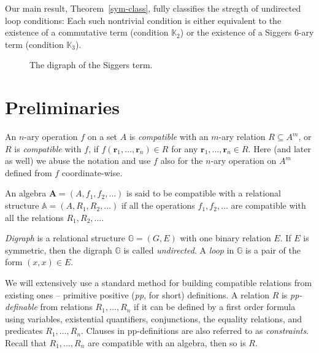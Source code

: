 \documentclass[a4paper]{article}
\def\inkpict#1#2#3{\medskip
\begin{figure}[!ht]
  \def\svgwidth{#1}
  \centering
     
  \caption{#3}
\end{figure}
}
\newcommand{\alg}[1]{\mathbf{#1}}
\newcommand{\relstr}[1]{\mathbb{#1}}
\newcommand{\tuple}[1]{\mathbf{#1}}
\begin{document}
Our main result, Theorem~\ref{sym-class}, fully classifies the stregth of undirected loop conditions: Each such nontrivial condition is either equivalent to the existence of a commutative term (condition $\relstr{K}_2$) or the existence of a Siggers $6$-ary term (condition $\relstr{K}_3$).

\inkpict{2cm}{xyz-triangle}{The digraph of the Siggers term.}

\section{Preliminaries}


An $n$-ary operation $f$ on a set $A$ is \emph{compatible} with an $m$-ary relation $R \subseteq A^m$, or $R$ is \emph{compatible} with $f$, if $f(\tuple{r}_1, \ldots, \tuple{r}_n) \in R$ for any $\tuple{r}_1, \ldots, \tuple{r}_n \in R$. Here (and later as well) we abuse the notation and use $f$ also for the $n$-ary operation on $A^m$ defined from $f$ coordinate-wise.

An algebra $\alg A=(A, f_1, f_2, \ldots)$ is said to be compatible with a relational structure $\relstr A=(A, R_1, R_2, \ldots)$ if all the operations $f_1, f_2, \ldots$ are compatible with all the relations $R_1, R_2, \ldots$.

\emph{Digraph} is a relational structure $\relstr G=(G, E)$ with one binary relation $E$. If $E$ is symmetric, then the digraph $\relstr G$ is called \emph{undirected}. A \emph{loop} in $\relstr G$ is a pair of the form $(x,x)\in E$.

We will extensively use a standard method for building compatible
relations from existing ones -- primitive positive (\emph{pp}, for short) definitions.
A relation $R$ is {\it pp-definable\/} from relations
$R_1,\ldots,R_n$ if it can be defined by a first order formula using variables,
existential quantifiers, conjunctions, the equality relations, and predicates $R_1,\ldots,R_n$.
Clauses in pp-definitions are also referred to as \emph{constraints}.
Recall that $R_1,\ldots,R_n$ are compatible with an algebra, then so is $R$.
\end{document}
